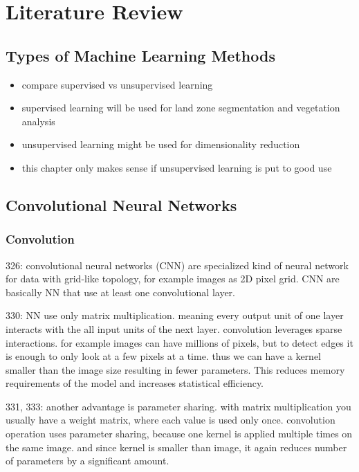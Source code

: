 \section{Literature Review}

\subsection{Types of Machine Learning Methods}
\begin{itemize}
    \item compare supervised vs unsupervised learning
    \item supervised learning will be used for land zone segmentation and vegetation analysis
    \item unsupervised learning might be used for dimensionality reduction
    \item this chapter only makes sense if unsupervised learning is put to good use
\end{itemize}

\subsection{Convolutional Neural Networks}

\subsubsection{Convolution}
\cite{DLbook16}
326: convolutional neural networks (CNN) are specialized kind of neural network for data with grid-like topology, for example images as 2D pixel grid. CNN are basically NN that use at least one convolutional layer.

330: NN use only matrix multiplication. meaning every output unit of one layer interacts with the all input units of the next layer. convolution leverages sparse interactions. for example images can have millions of pixels, but to detect edges it is enough to only look at a few pixels at a time. thus we can have a kernel smaller than the image size resulting in fewer parameters. This reduces memory requirements of the model and increases statistical efficiency.

331, 333: another advantage is parameter sharing. with matrix multiplication you usually have a weight matrix, where each value is used only once. convolution operation uses parameter sharing, because one kernel is applied multiple times on the same image. and since kernel is smaller than image, it again reduces number of parameters by a significant amount.


